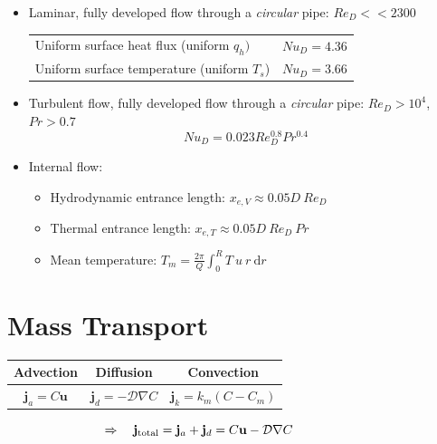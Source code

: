 \documentclass[11pt,a4paper]{article}
\begin{document}
\begin{itemize}
    \item Laminar, fully developed flow through a \textit{circular} pipe: $Re_{D}<<2300$
    \begin{center}
        \begin{tabular}{l l}
        Uniform surface heat flux (uniform $q_{h})$ & $Nu_{D}=4.36$ \\ [1.3ex]  
        Uniform surface temperature (uniform $T_{s}$) &  $Nu_{D}=3.66$	
    \end{tabular}
    \end{center}
    
    \item Turbulent flow, fully developed flow through a \textit{circular} pipe: $Re_{D}>10^{4}$, $Pr>0.7$
    \[Nu_{D} = 0.023 Re_{D}^{0.8}Pr^{0.4}\]

    \item Internal flow: 
    \begin{itemize}
        \item Hydrodynamic entrance length: $\displaystyle 
        x_{e,V} \approx 0.05 D \ Re_{D}$
        \item Thermal entrance length: $\displaystyle x_{e,T} \approx 0.05 D \ Re_{D} \ Pr$
        \item Mean temperature: $\displaystyle T_{m} = \frac{2\pi}{Q}\int_{0}^{R}T\ u\ r\ \mathrm{d}r$
    \end{itemize}
\end{itemize}
\section{Mass Transport}
\begin{minipage}{.6\textwidth}
\begin{table}[H]
    \centering
    \begin{tabular}{ccc}
    \toprule
    Advection   &   Diffusion   &   Convection \\
    \midrule
    $\mathbf{j}_{a}=C\mathbf{u}$    &   $\mathbf{j}_{d}=-\mathcal{D}\nabla C$ &   $\mathbf{j}_{k}=k_{m}(C-C_{m})$ \\
    \bottomrule
    \end{tabular}
\end{table}
\end{minipage}
\begin{minipage}{.3\textwidth}
\[
    \hspace{-2cm} \Rightarrow \quad \mathbf{j}_{\textrm{total}} = \mathbf{j}_{a} + \mathbf{j}_{d} = C\mathbf{u} - \mathcal{D}\nabla C
\]
\end{minipage}
\end{document}
